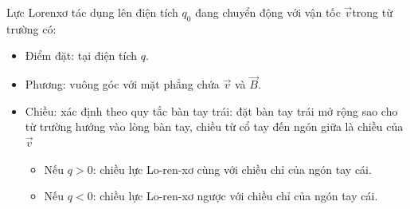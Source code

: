 Lực Lorenxơ tác dụng lên điện tích $q_0$ đang chuyển động với vận tốc $\vec{v}$trong từ trường có:
\begin{itemize}
	\item Điểm đặt: tại điện tích $q$.
	\item Phương: vuông góc với mặt phẳng chứa $\vec{v}$ và $\vec{B}$. 
	\item Chiều: xác định theo quy tắc bàn tay trái: đặt bàn tay trái mở rộng sao cho từ trường hướng vào lòng bàn tay, chiều từ cổ tay đến ngón giữa là chiều của $\vec{v}$
	\begin{itemize}
		\item Nếu $q>0$: chiều lực Lo-ren-xơ cùng với chiều chỉ của ngón tay cái.
		\item Nếu $q<0$: chiều lực Lo-ren-xơ ngược với chiều chỉ của ngón tay cái.
	\end{itemize}
	
\end{itemize}


\vspace{1em}

